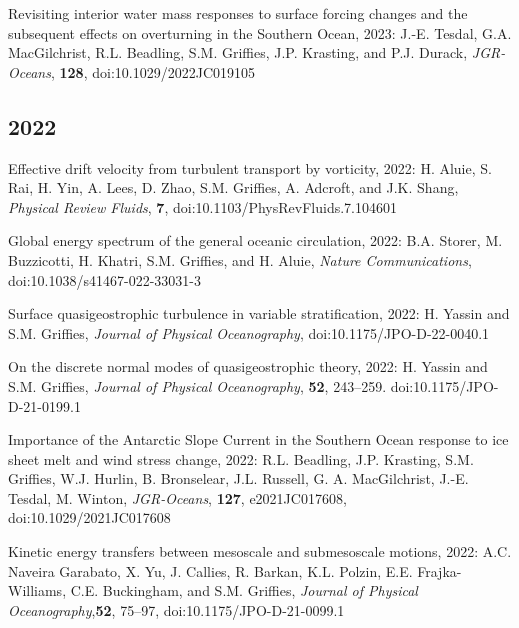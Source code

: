 \begin{etaremune}
\item Revisiting interior water mass responses to surface forcing changes and the subsequent effects on overturning in the Southern Ocean, 2023: J.-E. Tesdal, G.A. MacGilchrist, R.L. Beadling, S.M. Grif\/f\/ies, J.P. Krasting, and P.J. Durack, {\it JGR-Oceans}, {\bf 128}, doi:10.1029/2022JC019105


\subsection*{\sc \color{Maroon} 2022}

\item Effective drift velocity from turbulent transport by vorticity, 2022: H. Aluie, S. Rai, H. Yin, A. Lees, D. Zhao, S.M. Grif\/f\/ies, A. Adcroft, and J.K. Shang, {\it  Physical Review Fluids}, {\bf 7}, doi:10.1103/PhysRevFluids.7.104601

\item Global energy spectrum of the general oceanic circulation, 2022: B.A. Storer, M. Buzzicotti, H. Khatri, S.M. Grif\/f\/ies, and H. Aluie, {\it Nature Communications}, 
doi:10.1038/s41467-022-33031-3



\item Surface quasigeostrophic turbulence in variable stratification, 2022: H. Yassin and S.M. Grif\/f\/ies,  {\it Journal of Physical Oceanography}, doi:10.1175/JPO-D-22-0040.1

\item On the discrete normal modes of quasigeostrophic theory, 2022: H. Yassin and S.M. Grif\/f\/ies,  {\it Journal of Physical Oceanography}, {\bf 52}, 243--259.  doi:10.1175/JPO-D-21-0199.1

\item Importance of the Antarctic Slope Current in the Southern Ocean response to ice sheet melt and wind stress change, 2022: R.L. Beadling, J.P. Krasting, S.M. Grif\/f\/ies, W.J. Hurlin, B. Bronselear, J.L. Russell, G. A. MacGilchrist, J.-E. Tesdal, M. Winton, {\it JGR-Oceans}, {\bf 127}, e2021JC017608, doi:10.1029/2021JC017608

\item Kinetic energy transfers between mesoscale and submesoscale motions, 2022: A.C. Naveira Garabato, X. Yu, J. Callies, R. Barkan, K.L. Polzin, E.E. Frajka-Williams, C.E. Buckingham, and S.M. Grif\/f\/ies, {\it Journal of Physical Oceanography},{\bf 52}, 75--97, doi:10.1175/JPO-D-21-0099.1


\end{etaremune}
